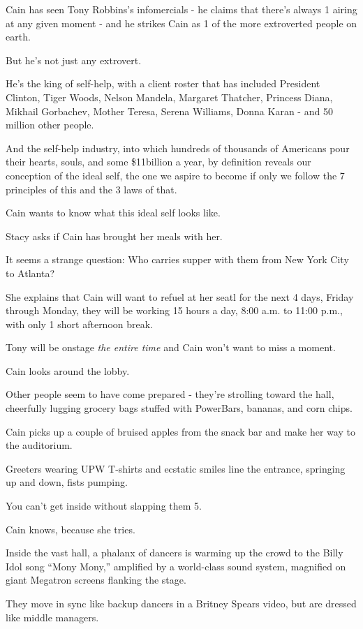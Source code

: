 \documentclass[oneside]{article}
\numberwithin{equation}{section}
\begin{document}
%
Cain has seen Tony Robbins's infomercials - he claims that there's always 1 airing at any given moment - and he strikes Cain as 1 of the more extroverted people on earth.

But he's not just any extrovert.

He's the king of self-help, with a client roster that has included President Clinton, Tiger Woods, Nelson Mandela, Margaret Thatcher, Princess Diana, Mikhail Gorbachev, Mother Teresa, Serena Williams, Donna Karan - and 50 million other people.

And the self-help industry, into which hundreds of thousands of Americans pour their hearts, souls, and some \$11billion a year, by definition reveals our conception of the ideal self, the one we aspire to become if only we follow the 7 principles of this and the 3 laws of that.

Cain wants to know what this ideal self looks like.

%
Stacy asks if Cain has brought her meals with her.

It seems a strange question: Who carries supper with them from New York City to Atlanta?

She explains that Cain will want to refuel at her seatl for the next 4 days, Friday through Monday, they will be working 15 hours a day, 8:00 a.m. to 11:00 p.m., with only 1 short afternoon break.

Tony will be onstage \textit{the entire time} and Cain won't want to miss a moment.

%
Cain looks around the lobby.

Other people seem to have come prepared - they're strolling toward the hall, cheerfully lugging grocery bags stuffed with PowerBars, bananas, and corn chips.

Cain picks up a couple of bruised apples from the snack bar and make her way to the auditorium.

Greeters wearing UPW T-shirts and ecstatic smiles line the entrance, springing up and down, fists pumping.

You can't get inside without slapping them 5.

Cain knows, because she tries.

%
Inside the vast hall, a phalanx of dancers is warming up the crowd to the Billy Idol song ``Mony Mony,'' amplified by a world-class sound system, magnified on giant Megatron screens flanking the stage.

They move in sync like backup dancers in a Britney Spears video, but are dressed like middle managers.
\end{document}
